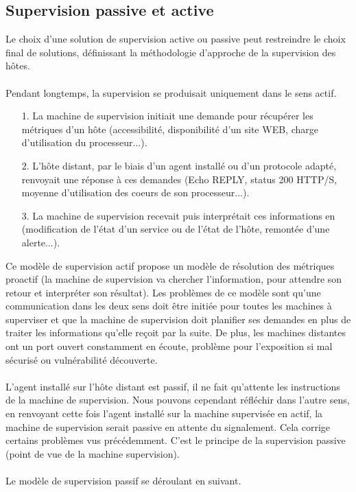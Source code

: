 \subsection{Supervision passive et active}

Le choix d'une solution de supervision active ou passive peut restreindre le choix final de solutions, définissant la méthodologie d'approche de la supervision des hôtes.
\\ \\
Pendant longtemps, la supervision se produisait uniquement dans le sens actif.

\begin{itemize}
    \item[1.] La machine de supervision initiait une demande pour récupérer les métriques d'un hôte (accessibilité, disponibilité d'un site WEB, charge d'utilisation du processeur...).
    \item[2.] L'hôte distant, par le biais d'un agent installé ou d'un protocole adapté, renvoyait une réponse à ces demandes (Echo REPLY, status 200 HTTP/S, moyenne d'utilisation des coeurs de son processeur...).
    \item[3.] La machine de supervision recevait puis interprétait ces informations en (modification de l'état d'un service ou de l'état de l'hôte, remontée d'une alerte...).
\end{itemize}

\noindent Ce modèle de supervision actif propose un modèle de résolution des métriques proactif (la machine de supervision va chercher l'information, pour attendre son retour et interpréter son résultat). Les problèmes de ce modèle sont qu'une communication dans les deux sens doit être initiée pour toutes les machines à superviser et que la machine de supervision doit planifier ses demandes en plus de traiter les informations qu'elle reçoit par la suite. De plus, les machines distantes ont un port ouvert constamment en écoute, problème pour l'exposition si mal sécurisé ou vulnérabilité découverte.
\\ \\
L'agent installé sur l'hôte distant est passif, il ne fait qu'attente les instructions de la machine de supervision. Nous pouvons cependant réfléchir dans l'autre sens, en renvoyant cette fois l'agent installé sur la machine supervisée en actif, la machine de supervision serait passive en attente du signalement. Cela corrige certains problèmes vus précédemment. C'est le principe de la supervision passive (point de vue de la machine supervision).
\\ \\
Le modèle de supervision passif se déroulant en suivant.

